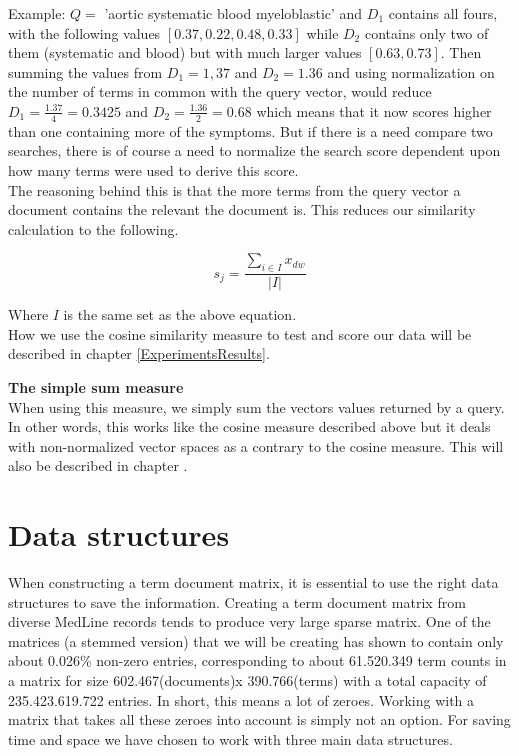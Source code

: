 Example: $Q =$ 'aortic systematic blood myeloblastic' and $D_{1}$
contains all fours, with the following values $[0.37, 0.22, 0.48,
0.33]$ while $D_{2}$ contains only two of them (systematic and blood)
but with much larger values $[0.63, 0.73]$. Then summing the values
from $D_1 = 1,37$ and $D_2 = 1.36$ and using normalization on the
number of terms in common with the query vector, would reduce $D_1 =
\frac{1.37}{4} = 0.3425$ and $D_2 = \frac{1.36}{2} = 0.68$ which means
that it now scores higher than one containing more of the
symptoms. But if there is a need compare two searches, there is of
course a need to normalize the search score dependent upon how many
terms were used to derive this score. \\

The reasoning behind this is that the more terms from the query vector
a document contains the relevant the document is. This reduces our
similarity calculation to the following. 

\[
s_j = \frac{\sum_{i \in I} x_{dw}}{|I|}
\]

Where $I$ is the same set as the above equation. \\

How we use the cosine similarity measure to test and score our data will be described in chapter \ref{ExperimentsResults}. \\


\textbf{The simple sum measure\label{SimpleSum}} \\
When using this measure, we simply sum the vectors values returned by
a query. In other words, this works like the cosine measure described
above but it deals with non-normalized vector spaces as a contrary to
the cosine measure. This will also be described in chapter
.

\section{Data structures}

When constructing a term document matrix, it is essential to use the
right data structures to save the information. Creating a term
document matrix from diverse MedLine records tends to produce very
large sparse matrix. One of the matrices (a stemmed version) that we
will be creating has shown to contain only about 0.026\% non-zero
entries, corresponding to about 61.520.349 term counts in a matrix for
size 602.467(documents)x 390.766(terms) with a total capacity of
235.423.619.722 entries. In short, this means a lot of zeroes. Working
with a matrix that takes all these zeroes into account is simply not
an option. For saving time and space we have chosen to work with three
main data structures.


